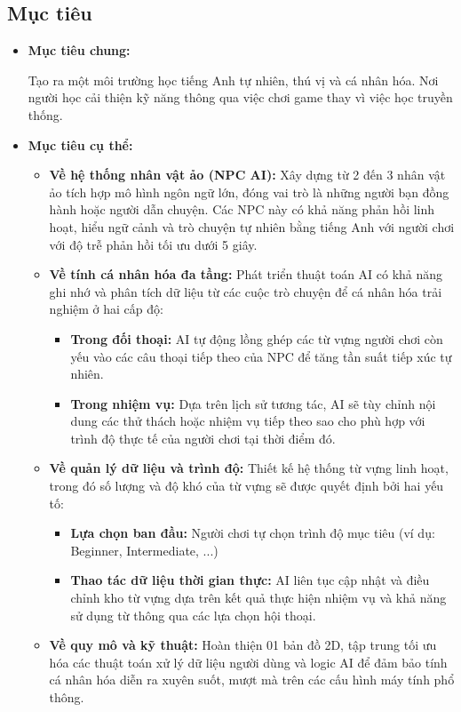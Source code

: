 \subsection{Mục tiêu}
\begin{itemize}[label=-]
\item \textbf{Mục tiêu chung:}

\hspace*{2em}Tạo ra một môi trường học tiếng Anh tự nhiên, thú vị và cá nhân hóa. Nơi người học cải thiện kỹ năng thông qua việc chơi game thay vì việc học truyền thống.
\item \textbf{Mục tiêu cụ thể:}
\begin{itemize}[label=+]
\item \textbf{Về hệ thống nhân vật ảo (NPC AI):} Xây dựng từ 2 đến 3 nhân vật ảo tích hợp mô hình ngôn ngữ lớn, đóng vai trò là những người bạn đồng hành hoặc người dẫn chuyện. Các NPC này có khả năng phản hồi linh hoạt, hiểu ngữ cảnh và trò chuyện tự nhiên bằng tiếng Anh với người chơi với độ trễ phản hồi tối ưu dưới 5 giây.
\item \textbf{Về tính cá nhân hóa đa tầng:} Phát triển thuật toán AI có khả năng ghi nhớ và phân tích dữ liệu từ các cuộc trò chuyện để cá nhân hóa trải nghiệm ở hai cấp độ:
\begin{itemize}[label=\textbullet]
\item \textbf{Trong đối thoại:} AI tự động lồng ghép các từ vựng người chơi còn yếu vào các câu thoại tiếp theo của NPC để tăng tần suất tiếp xúc tự nhiên.
\item\textbf{Trong nhiệm vụ:} Dựa trên lịch sử tương tác, AI sẽ tùy chỉnh nội dung các thử thách hoặc nhiệm vụ tiếp theo sao cho phù hợp với trình độ thực tế của người chơi tại thời điểm đó.
\end{itemize}
\item \textbf{Về quản lý dữ liệu và trình độ:} Thiết kế hệ thống từ vựng linh hoạt, trong đó số lượng và độ khó của từ vựng sẽ được quyết định bởi hai yếu tố:
\begin{itemize}[label=\textbullet]
\item \textbf{Lựa chọn ban đầu:} Người chơi tự chọn trình độ mục tiêu (ví dụ: Beginner, Intermediate, ...)
\item \textbf{Thao tác dữ liệu thời gian thực:} AI liên tục cập nhật và điều chỉnh kho từ vựng dựa trên kết quả thực hiện nhiệm vụ và khả năng sử dụng từ thông qua các lựa chọn hội thoại.
\end{itemize}
\item \textbf{Về quy mô và kỹ thuật:} Hoàn thiện 01 bản đồ 2D, tập trung tối ưu hóa các thuật toán xử lý dữ liệu người dùng và logic AI để đảm bảo tính cá nhân hóa diễn ra xuyên suốt, mượt mà trên các cấu hình máy tính phổ thông.


\end{itemize}

\end{itemize}
